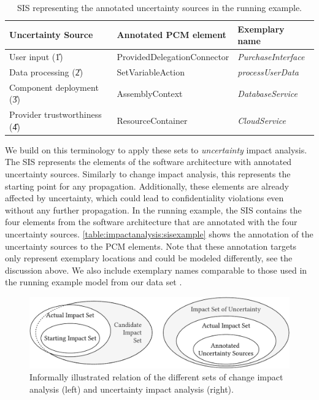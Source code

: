 \begin{table}
    \centering
    \begin{tabularx}{\linewidth}{llX}
        \toprule
        Uncertainty Source \,                   & Annotated \ac{PCM} element            & Exemplary name \\
        \midrule
        User input (\U{1})                & ProvidedDelegationConnector           & \emph{PurchaseInterface} \\
        Data processing (\U{2})           & SetVariableAction                     & \emph{processUserData} \\
        Component deployment (\U{3})      & AssemblyContext                       & \emph{DatabaseService} \\
        Provider trustworthiness (\U{4})  & ResourceContainer                     & \emph{CloudService} \\
        \bottomrule
    \end{tabularx}
    \caption{\acf*{SIS} representing the annotated uncertainty sources in the running example.}%
    \label{table:impactanalysis:sisexample}
\end{table}

We build on this terminology to apply these sets to \emph{uncertainty} impact analysis.
The \ac{SIS} represents the elements of the software architecture with annotated uncertainty sources.
Similarly to change impact analysis, this represents the starting point for any propagation.
Additionally, these elements are already affected by uncertainty, which could lead to confidentiality violations even without any further propagation.
In the running example, the \ac{SIS} contains the four elements from the software architecture that are annotated with the four uncertainty sources.
\autoref{table:impactanalysis:sisexample} shows the annotation of the uncertainty sources to the \ac{PCM} elements.
Note that these annotation targets only represent exemplary locations and could be modeled differently, see the discussion above.
We also include exemplary names comparable to those used in the running example model from our data set \cite{dataset}.

\begin{figure}
    \centering
    \includegraphics[width=\linewidth]{figures/chapter6/impactset.pdf}
    \caption{Informally illustrated relation of the different sets of change impact analysis (left) and uncertainty impact analysis (right).}
    \label{fig:impactanalysis:representing:sets}
\end{figure}

